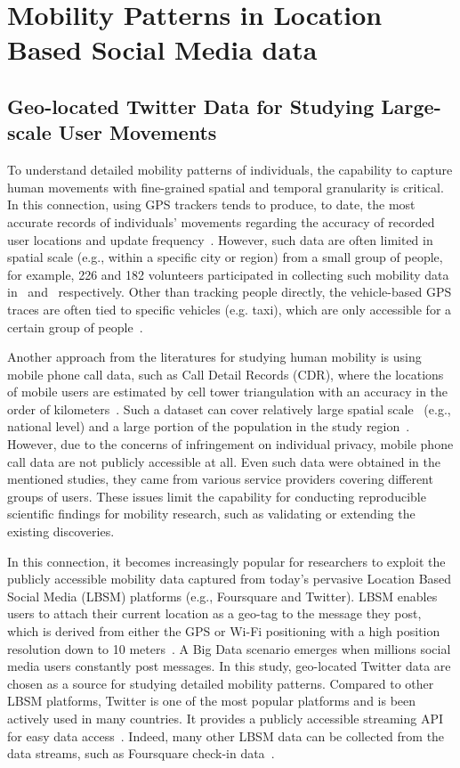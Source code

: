 \documentclass{elsart}
\begin{document}
\section{Mobility Patterns in Location Based Social Media data}
\subsection{Geo-located Twitter Data for Studying Large-scale User Movements}
To understand detailed mobility patterns of individuals, the capability to capture human movements with fine-grained spatial and temporal granularity is critical.
In this connection, using GPS trackers tends to produce, to date, the most accurate records of individuals' movements regarding the accuracy of recorded user locations and update frequency~\cite{zheng2008understanding}.
However, such data are often limited in spatial scale (e.g., within a specific city or region) from a small group of people, for example, 226 and 182 volunteers participated in collecting such mobility data in~\cite{rhee2011levy} and~\cite{zheng2010geolife} respectively.
Other than tracking people directly, the vehicle-based GPS traces are often tied to specific vehicles (e.g. taxi), which are only accessible for a certain group of people~\cite{kung2014exploring}. 

Another approach from the literatures for studying human mobility is using mobile phone call data, such as Call Detail Records (CDR), where the locations of mobile users are estimated by cell tower triangulation with an accuracy in the order of kilometers~\cite{gonzalez2008understanding,sevtsuk2010does,kung2014exploring}.
Such a dataset can cover relatively large spatial scale~\cite{becker2013human,sobolevsky2013delineating} (e.g., national level) and a large portion of the population in the study region~\cite{kung2014exploring}.
However, due to the concerns of infringement on individual privacy, mobile phone call data are not publicly accessible at all.
Even such data were obtained in the mentioned studies, they came from various service providers covering different groups of users.
These issues limit the capability for conducting reproducible scientific findings for mobility research, such as validating or extending the existing discoveries.

In this connection, it becomes increasingly popular for researchers to exploit the publicly accessible mobility data captured from today's pervasive Location Based Social Media (LBSM) platforms (e.g., Foursquare and Twitter).
LBSM enables users to attach their current location as a geo-tag to the message they post, which is derived from either the GPS or Wi-Fi positioning with a high position resolution down to 10 meters~\cite{Jurdak2015}.
A Big Data scenario emerges when millions social media users constantly post messages.
In this study, geo-located Twitter data are chosen as a source for studying detailed mobility patterns.
Compared to other LBSM platforms, Twitter is one of the most popular platforms and is been actively used in many countries.
It provides a publicly accessible streaming API for easy data access~\cite{twitterAPI}.
Indeed, many other LBSM data can be collected from the data streams, such as Foursquare check-in data~\cite{cranshaw2012livehoods,hasan2013understanding}.
\end{document}
